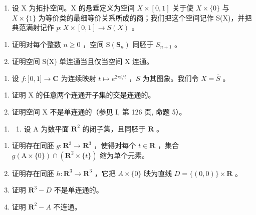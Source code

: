 \exercisegroup

\begin{enumerate}
\def\labelenumi{\arabic{enumi})}
\tightlist
\item
  设 X 为拓扑空间。X 的悬垂定义为空间 \(X \times [0,1]\) 关于使 \(X \times \{0\}\) 与 \(X \times \{1\}\) 为等价类的最细等价关系所成的商；我们把这个空间记作 S(X)，并把典范满射记作 \(p: X \times [0,1] \to S(X)\) 。
\end{enumerate}

\begin{enumerate}
\def\labelenumi{\alph{enumi})}
\item
  证明对每个整数 \(n \geqslant 0\) ，空间 \(\mathrm{S}(\mathbf{S}_{n})\) 同胚于 \(S_{n+1}\) 。
\item
  证明空间 S(X) 单连通当且仅当空间 X 连通。
\end{enumerate}

\begin{enumerate}
\def\labelenumi{\arabic{enumi})}
\setcounter{enumi}{1}
\tightlist
\item
  设 \(f: ]0,1] \to \mathbf{C}\) 为连续映射 \(t \mapsto e^{2\pi i / t}\) ，\(S\) 为其图象。我们令 \(X = \overline{S}\) 。
\end{enumerate}

\begin{enumerate}
\def\labelenumi{\alph{enumi})}
\item
  证明 X 的任意两个连通开子集的交是连通的。
\item
  证明空间 X 不是单连通的（参见 I, 第 126 页, 命题 5）。
\end{enumerate}

\begin{enumerate}
\def\labelenumi{\arabic{enumi})}
\setcounter{enumi}{2}
\tightlist
\item
  \begin{enumerate}
  \def\labelenumii{(\arabic{enumii})}
  \setcounter{enumii}{2}
  \tightlist
  \item
    设 A 为数平面 \(\mathbf{R}^2\) 的闭子集，且同胚于 \(\mathbf{R}\) 。
  \end{enumerate}
\end{enumerate}

\begin{enumerate}
\def\labelenumi{\alph{enumi})}
\item
  证明存在同胚 \(g \colon \mathbf{R}^3 \to \mathbf{R}^3\) ，使得对每个 \(t \in \mathbf{R}\) ，集合 \(g(\mathrm{A} \times \{0\}) \cap (\mathbf{R}^2 \times \{t\})\) 缩为单个元素。
\item
  证明存在同胚 \(h: \mathbf{R}^{3} \to \mathbf{R}^{3}\) ，它把 \(A \times \{0\}\) 映为直线 \(D = \{(0,0)\} \times \mathbf{R}\) 。
\item
  证明 \(\mathbf{R}^{3} - D\) 不是单连通的。
\item
  证明 \(\mathbf{R}^{2} - A\) 不连通。
\end{enumerate}

